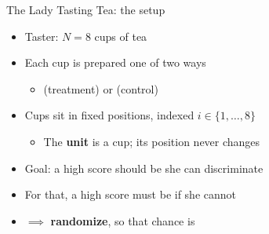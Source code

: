 \documentclass[table, xcolor = {dvipsnames}, 9pt]{beamer}
\theoremstyle{plain}
\newcommand{\mh}[1]{{\color{magenta}{#1}}}
\begin{document}
\begin{frame}[t]{The Lady Tasting Tea: the setup}
\vfill
\begin{itemize} \vfill
\item Taster: $N = 8$ cups of tea \vfill
\item Each cup is prepared one of two ways \vfill 
\begin{itemize} \vfill 
\item \mh{milk-first} (treatment) or \mh{tea-first} (control) \vfill
\end{itemize} \vfill 
\item Cups sit in fixed positions, indexed $i \in \{1, \ldots, 8\}$ \vfill
\begin{itemize} \vfill
\item The \textbf{unit} is a cup; its position never changes \vfill
\end{itemize} \vfill
\item Goal: a high score should be \mh{strong evidence} she can discriminate \vfill
\item For that, a high score must be \mh{unlikely by chance} if she cannot \vfill
\item[] $\implies$ \textbf{randomize}, so that chance is \mh{known} \vfill
\end{itemize} \vfill
\end{frame}
\end{document}
